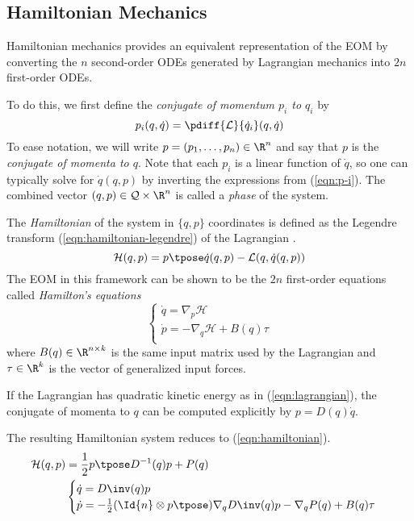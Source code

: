 \subsection{Hamiltonian Mechanics}
Hamiltonian mechanics provides an equivalent representation of the EOM
by converting the \(n\) second-order ODEs generated by Lagrangian mechanics into
\(2n\) first-order ODEs.

To do this, we first define the \textit{conjugate of momentum \(p_i\) to \(q_i\)} by
\begin{equation}\label{eqn:p-i}
    p_i(q,\dot{q}) = \pdiff{\mathcal{L}}{\dot{q}_i}(q,\dot{q})
\end{equation}
To ease notation, we will write \(p = (p_1, \ldots, p_n) \in \R^n\) and say that
\(p\) is the \textit{conjugate of momenta to \(q\)}.
Note that each \(p_i\) is a linear function of \(\dot{q}\), so one can typically
solve for \(\dot{q}(q,p)\) by inverting the expressions from (\ref{eqn:p-i}).
The combined vector \((q,p) \in \mathcal{Q}\times\R^n\) is called a 
\textit{phase} of the system. 

The \textit{Hamiltonian} of the system in
\(\{q,p\}\) coordinates is defined as the Legendre transform 
(\ref{eqn:hamiltonian-legendre}) of the Lagrangian \cite{landau_mechanics}.
\begin{equation}\label{eqn:hamiltonian-legendre}
    \mathcal{H}(q,p) = p\tpose \dot{q}(q,p) - \mathcal{L}(q,\dot{q}(q,p))
\end{equation}
The EOM in this framework can be shown to be the \(2n\)
first-order equations called \textit{Hamilton's equations}
\begin{equation}\label{eqn:hamiltons-eqns}
    \begin{cases}
        \dot{q} = \nabla_p\mathcal{H} \\
        \dot{p} = -\nabla_q\mathcal{H} + B(q)\tau \\
    \end{cases}
\end{equation}
where \(B(q) \in \R^{n\times k}\) is the same input matrix used by the
Lagrangian and \(\tau \in \R^k\) is the vector of generalized input forces.

If the Lagrangian has quadratic kinetic energy as in (\ref{eqn:lagrangian}), 
the conjugate of
momenta to \(q\) can be computed explicitly by \(p = D(q)\dot{q}\).

The resulting Hamiltonian system reduces to (\ref{eqn:hamiltonian}).
\begin{align}\label{eqn:hamiltonian}
    \mathcal{H}(q,p) &= \frac{1}{2} p\tpose D^{-1}(q) p + P(q) \\
                     &\begin{cases}
        \dot{q} = D\inv(q)p \\
        \dot{p} = -\frac{1}{2} (\Id{n} \otimes p\tpose) \nabla_q D\inv(q) p
        - \nabla_q P(q) + B(q) \tau \\
    \end{cases} 
\end{align}

